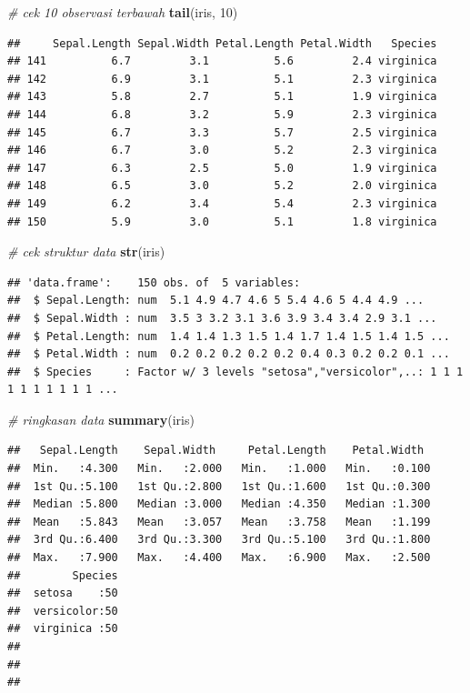 \documentclass[]{book}
\newenvironment{Shaded}{\begin{snugshade}}{\end{snugshade}}
\newcommand{\CommentTok}[1]{\textcolor[rgb]{0.56,0.35,0.01}{\textit{#1}}}
\newcommand{\DecValTok}[1]{\textcolor[rgb]{0.00,0.00,0.81}{#1}}
\newcommand{\KeywordTok}[1]{\textcolor[rgb]{0.13,0.29,0.53}{\textbf{#1}}}
\newcommand{\NormalTok}[1]{#1}
\theoremstyle{definition}
\theoremstyle{definition}
\theoremstyle{definition}
\theoremstyle{remark}
\begin{document}
\begin{Shaded}
\begin{Highlighting}[]
\CommentTok{# cek 10 observasi terbawah}
\KeywordTok{tail}\NormalTok{(iris, }\DecValTok{10}\NormalTok{)}
\end{Highlighting}
\end{Shaded}

\begin{verbatim}
##     Sepal.Length Sepal.Width Petal.Length Petal.Width   Species
## 141          6.7         3.1          5.6         2.4 virginica
## 142          6.9         3.1          5.1         2.3 virginica
## 143          5.8         2.7          5.1         1.9 virginica
## 144          6.8         3.2          5.9         2.3 virginica
## 145          6.7         3.3          5.7         2.5 virginica
## 146          6.7         3.0          5.2         2.3 virginica
## 147          6.3         2.5          5.0         1.9 virginica
## 148          6.5         3.0          5.2         2.0 virginica
## 149          6.2         3.4          5.4         2.3 virginica
## 150          5.9         3.0          5.1         1.8 virginica
\end{verbatim}

\begin{Shaded}
\begin{Highlighting}[]
\CommentTok{# cek struktur data}
\KeywordTok{str}\NormalTok{(iris)}
\end{Highlighting}
\end{Shaded}

\begin{verbatim}
## 'data.frame':    150 obs. of  5 variables:
##  $ Sepal.Length: num  5.1 4.9 4.7 4.6 5 5.4 4.6 5 4.4 4.9 ...
##  $ Sepal.Width : num  3.5 3 3.2 3.1 3.6 3.9 3.4 3.4 2.9 3.1 ...
##  $ Petal.Length: num  1.4 1.4 1.3 1.5 1.4 1.7 1.4 1.5 1.4 1.5 ...
##  $ Petal.Width : num  0.2 0.2 0.2 0.2 0.2 0.4 0.3 0.2 0.2 0.1 ...
##  $ Species     : Factor w/ 3 levels "setosa","versicolor",..: 1 1 1 1 1 1 1 1 1 1 ...
\end{verbatim}

\begin{Shaded}
\begin{Highlighting}[]
\CommentTok{# ringkasan data}
\KeywordTok{summary}\NormalTok{(iris)}
\end{Highlighting}
\end{Shaded}

\begin{verbatim}
##   Sepal.Length    Sepal.Width     Petal.Length    Petal.Width   
##  Min.   :4.300   Min.   :2.000   Min.   :1.000   Min.   :0.100  
##  1st Qu.:5.100   1st Qu.:2.800   1st Qu.:1.600   1st Qu.:0.300  
##  Median :5.800   Median :3.000   Median :4.350   Median :1.300  
##  Mean   :5.843   Mean   :3.057   Mean   :3.758   Mean   :1.199  
##  3rd Qu.:6.400   3rd Qu.:3.300   3rd Qu.:5.100   3rd Qu.:1.800  
##  Max.   :7.900   Max.   :4.400   Max.   :6.900   Max.   :2.500  
##        Species  
##  setosa    :50  
##  versicolor:50  
##  virginica :50  
##                 
##                 
## 
\end{verbatim}
\end{document}
